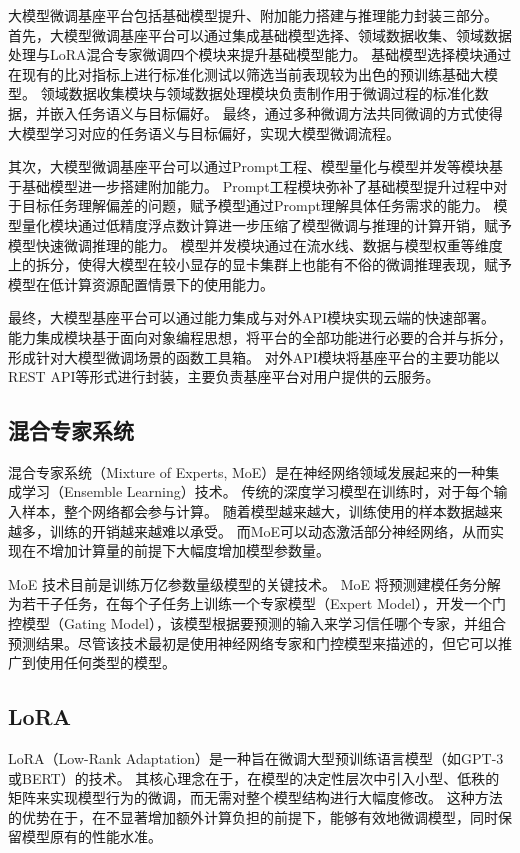 大模型微调基座平台包括基础模型提升、附加能力搭建与推理能力封装三部分。
首先，大模型微调基座平台可以通过集成基础模型选择、领域数据收集、领域数据处理与LoRA混合专家微调四个模块来提升基础模型能力。
基础模型选择模块通过在现有的比对指标上进行标准化测试以筛选当前表现较为出色的预训练基础大模型。
领域数据收集模块与领域数据处理模块负责制作用于微调过程的标准化数据，并嵌入任务语义与目标偏好。
最终，通过多种微调方法共同微调的方式使得大模型学习对应的任务语义与目标偏好，实现大模型微调流程。

其次，大模型微调基座平台可以通过Prompt工程、模型量化与模型并发等模块基于基础模型进一步搭建附加能力。
Prompt工程模块弥补了基础模型提升过程中对于目标任务理解偏差的问题，赋予模型通过Prompt理解具体任务需求的能力。
模型量化模块通过低精度浮点数计算进一步压缩了模型微调与推理的计算开销，赋予模型快速微调推理的能力。
模型并发模块通过在流水线、数据与模型权重等维度上的拆分，使得大模型在较小显存的显卡集群上也能有不俗的微调推理表现，赋予模型在低计算资源配置情景下的使用能力。

最终，大模型基座平台可以通过能力集成与对外API模块实现云端的快速部署。
能力集成模块基于面向对象编程思想，将平台的全部功能进行必要的合并与拆分，形成针对大模型微调场景的函数工具箱。
对外API模块将基座平台的主要功能以REST API等形式进行封装，主要负责基座平台对用户提供的云服务。

\subsection{混合专家系统}

混合专家系统（Mixture of Experts, MoE）是在神经网络领域发展起来的一种集成学习（Ensemble Learning）技术。
传统的深度学习模型在训练时，对于每个输入样本，整个网络都会参与计算。
随着模型越来越大，训练使用的样本数据越来越多，训练的开销越来越难以承受。
而MoE可以动态激活部分神经网络，从而实现在不增加计算量的前提下大幅度增加模型参数量。

MoE 技术目前是训练万亿参数量级模型的关键技术。
MoE 将预测建模任务分解为若干子任务，在每个子任务上训练一个专家模型（Expert Model），开发一个门控模型（Gating Model），该模型根据要预测的输入来学习信任哪个专家，并组合预测结果。尽管该技术最初是使用神经网络专家和门控模型来描述的，但它可以推广到使用任何类型的模型。

\subsection{LoRA}

LoRA（Low-Rank Adaptation）是一种旨在微调大型预训练语言模型（如GPT-3或BERT）的技术。
其核心理念在于，在模型的决定性层次中引入小型、低秩的矩阵来实现模型行为的微调，而无需对整个模型结构进行大幅度修改。
这种方法的优势在于，在不显著增加额外计算负担的前提下，能够有效地微调模型，同时保留模型原有的性能水准。

